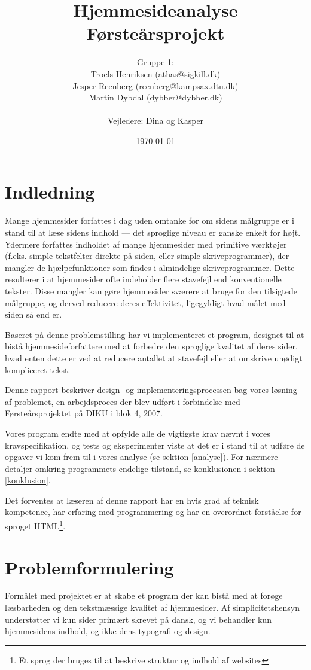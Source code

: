 \documentclass[a4paper,oneside]{memoir}
\title{Hjemmesideanalyse  \\ \small{Førsteårsprojekt}}
\author
{
  Gruppe 1:\\
  Troels Henriksen (athas@sigkill.dk)\\
  Jesper Reenberg (reenberg@kampsax.dtu.dk)\\
  Martin Dybdal (dybber@dybber.dk)\\ \\
  Vejledere: Dina og Kasper
}
\date{\today}
\begin{document}
\maketitle
\newpage
\tableofcontents*


\chapter{Indledning}
\label{indledning}
Mange hjemmesider forfattes i dag uden omtanke for om sidens målgruppe
er i stand til at læse sidens indhold --- det sproglige niveau er
ganske enkelt for højt. Ydermere forfattes indholdet af mange
hjemmesider med primitive værktøjer (f.eks. simple tekstfelter direkte
på siden, eller simple skriveprogrammer), der mangler de
hjælpefunktioner som findes i almindelige skriveprogrammer. Dette
resulterer i at hjemmesider ofte indeholder flere stavefejl end
konventionelle tekster. Disse mangler kan gøre hjemmesider sværere at
bruge for den tilsigtede målgruppe, og derved reducere deres
effektivitet, ligegyldigt hvad målet med siden så end er.

Baseret på denne problemstilling har vi implementeret et program,
designet til at bistå hjemmesideforfattere med at forbedre den
sproglige kvalitet af deres sider, hvad enten dette er ved at reducere
antallet at stavefejl eller at omskrive unødigt kompliceret tekst.

Denne rapport beskriver design- og implementeringsprocessen bag vores
løsning af problemet, en arbejdsproces der blev udført i forbindelse
med Førsteårsprojektet på DIKU i blok 4, 2007.

Vores program endte med at opfylde alle de vigtigste krav nævnt i
vores kravspecifikation, og tests og eksperimenter viste at det er i
stand til at udføre de opgaver vi kom frem til i vores analyse (se
sektion \ref{analyse}). For nærmere detaljer omkring programmets
endelige tilstand, se konklusionen i sektion \ref{konklusion}.

Det forventes at læseren af denne rapport har en hvis grad af teknisk
kompetence, har erfaring med programmering og har en overordnet
forståelse for sproget HTML\footnote{Et sprog der bruges til at
  beskrive struktur og indhold af websites}.

\chapter{Problemformulering}
\label{problemformulering}
Formålet med projektet er at skabe et program der kan bistå med at
forøge læsbarheden og den tekstmæssige kvalitet af hjemmesider. Af
simplicitetshensyn understøtter vi kun sider primært skrevet på dansk,
og vi behandler kun hjemmesidens indhold, og ikke dens typografi og
design.
\end{document}
